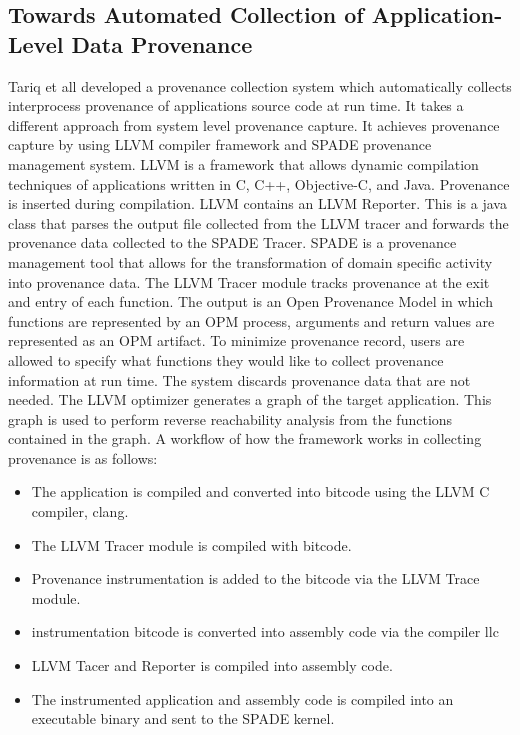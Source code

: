 \subsection{Towards Automated Collection of Application-Level Data Provenance}
Tariq et all developed a provenance collection system which automatically collects interprocess provenance of applications source code at run time. It takes a different approach from system level provenance capture. It achieves provenance capture by using LLVM compiler framework and SPADE provenance management system. LLVM is a framework that allows dynamic compilation techniques of applications written in C, C++, Objective-C, and Java. Provenance is inserted during compilation. LLVM contains an LLVM Reporter. This is a java class that parses the output file collected from the LLVM tracer and forwards the provenance data collected to the SPADE Tracer. SPADE is a provenance management tool that allows for the transformation of domain specific activity into provenance data. The LLVM Tracer module tracks provenance at the exit and entry of each function. The output is an Open Provenance Model in which functions are represented by an OPM process, arguments and return values are represented as an OPM artifact. To minimize provenance record, users are allowed to specify what functions they would like to collect provenance information at run time. The system discards provenance data that are not needed. The LLVM optimizer generates a graph of the target application. This graph is used to perform reverse reachability analysis  from the functions contained in the graph.  A workflow of how the framework works in collecting provenance is as follows:

\begin{itemize}
\item The application is compiled and converted into bitcode using the LLVM C compiler, clang.

\item The LLVM Tracer module is compiled with bitcode.

\item Provenance instrumentation is added to the bitcode via the LLVM Trace module.

\item instrumentation bitcode is converted into assembly code via the compiler llc

\item LLVM Tacer and Reporter is compiled into assembly code.

\item  The instrumented application and assembly code is compiled into an executable binary and sent to the SPADE kernel.
\end{itemize}

